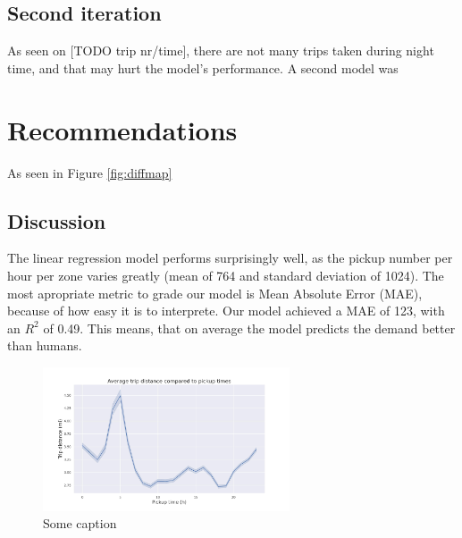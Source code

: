 \documentclass[11pt]{article}
\begin{document}
\subsection{Second iteration}

As seen on [TODO trip nr/time], there are not many trips taken during night time, and that may hurt the model's performance. A second model was 

\section{Recommendations}
As seen in Figure \autoref{fig:diffmap}


\subsection{Discussion} \label{discussion}

The linear regression model performs surprisingly well, as the pickup number per hour per zone varies greatly (mean of 764 and standard deviation of 1024). The most apropriate metric to grade our model is Mean Absolute Error (MAE), because of how easy it is to interprete. Our model achieved a MAE of 123, with an $R^2$ of 0.49. This means, that on average the model predicts the demand better than humans.

\begin{figure}[h]
    \includegraphics[width=0.65\textwidth]{pickuptime_distance.jpeg}
    \centering
    \caption{Some caption} %
\end{figure}
\end{document}
